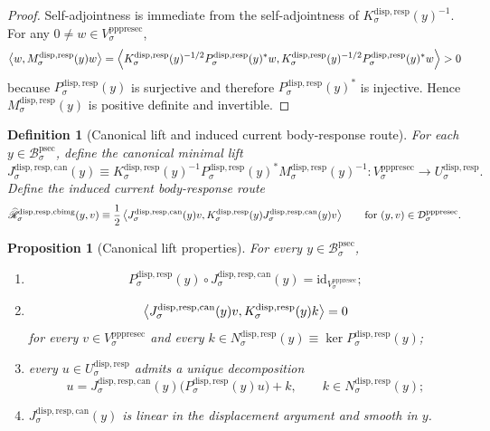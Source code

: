 \documentclass[11pt]{article}
\newcommand{\ProtoSectionBody}[1]{\mathcal B_{#1}^{\mathrm{psec}}}
\newcommand{\PrePreProtoSectionVertical}[1]{V_{#1}^{\mathrm{pppresec}}}
\newcommand{\PrePreProtoSectionResidualBody}[1]{\mathcal D_{#1}^{\mathrm{pppresec}}}
\newcommand{\SubstrateCarrier}[1]{U_{#1}^{\mathrm{disp,resp}}}
\newcommand{\SubstrateProjection}[1]{P_{#1}^{\mathrm{disp,resp}}}
\newcommand{\SubstrateOperator}[1]{K_{#1}^{\mathrm{disp,resp}}}
\newcommand{\SubstrateKernel}[1]{N_{#1}^{\mathrm{disp,resp}}}
\newcommand{\SchurResponse}[1]{M_{#1}^{\mathrm{disp,resp}}}
\newcommand{\CanonicalLift}[1]{J_{#1}^{\mathrm{disp,resp,can}}}
\newcommand{\CoreForcedBodyResponse}[1]{\widehat{\mathscr R}_{#1}^{\mathrm{disp,resp,cbimg}}}
\newtheorem{definition}{Definition}
\newtheorem{proposition}{Proposition}
\begin{document}
\begin{proof}
Self-adjointness is immediate from the self-adjointness of \(\SubstrateOperator{\sigma}(y)^{-1}\). For any \(0\neq w\in\PrePreProtoSectionVertical{\sigma}\),
\[
\ev{w,\SchurResponse{\sigma}(y)w}
=
\ev{
\SubstrateOperator{\sigma}(y)^{-1/2}\SubstrateProjection{\sigma}(y)^*w,
\SubstrateOperator{\sigma}(y)^{-1/2}\SubstrateProjection{\sigma}(y)^*w
}
>0
\]
because \(\SubstrateProjection{\sigma}(y)\) is surjective and therefore \(\SubstrateProjection{\sigma}(y)^*\) is injective. Hence \(\SchurResponse{\sigma}(y)\) is positive definite and invertible.
\end{proof}

\begin{definition}[Canonical lift and induced current body-response route]
\label{def:canonical}
For each \(y\in\ProtoSectionBody{\sigma}\), define the \emph{canonical minimal lift}
\begin{equation}
\CanonicalLift{\sigma}(y)
\equiv
\SubstrateOperator{\sigma}(y)^{-1}\SubstrateProjection{\sigma}(y)^*
\SchurResponse{\sigma}(y)^{-1}
:
\PrePreProtoSectionVertical{\sigma}\to\SubstrateCarrier{\sigma}.
\label{eq:canonical}
\end{equation}
Define the \emph{induced current body-response route}
\begin{equation}
\CoreForcedBodyResponse{\sigma}(y,v)
\equiv
\frac{1}{2}
\ev{
\CanonicalLift{\sigma}(y)v,
\SubstrateOperator{\sigma}(y)\CanonicalLift{\sigma}(y)v
}
\qquad
\text{for }
(y,v)\in\PrePreProtoSectionResidualBody{\sigma}.
\label{eq:coreresponse}
\end{equation}
\end{definition}

\begin{proposition}[Canonical lift properties]
\label{prop:canonical}
For every \(y\in\ProtoSectionBody{\sigma}\),
\begin{enumerate}
    \item
    \[
    \SubstrateProjection{\sigma}(y)\circ\CanonicalLift{\sigma}(y)
    =
    \mathrm{id}_{\PrePreProtoSectionVertical{\sigma}};
    \]
    \item
    \[
    \ev{
    \CanonicalLift{\sigma}(y)v,
    \SubstrateOperator{\sigma}(y)k
    }
    =
    0
    \]
    for every \(v\in\PrePreProtoSectionVertical{\sigma}\) and every \(k\in\SubstrateKernel{\sigma}(y)\equiv\ker\SubstrateProjection{\sigma}(y)\);
    \item every \(u\in\SubstrateCarrier{\sigma}\) admits a unique decomposition
    \[
    u
    =
    \CanonicalLift{\sigma}(y)\bigl(\SubstrateProjection{\sigma}(y)u\bigr)
    +
    k,
    \qquad
    k\in\SubstrateKernel{\sigma}(y);
    \]
    \item \(\CanonicalLift{\sigma}(y)\) is linear in the displacement argument and smooth in \(y\).
\end{enumerate}
\end{proposition}
\end{document}
